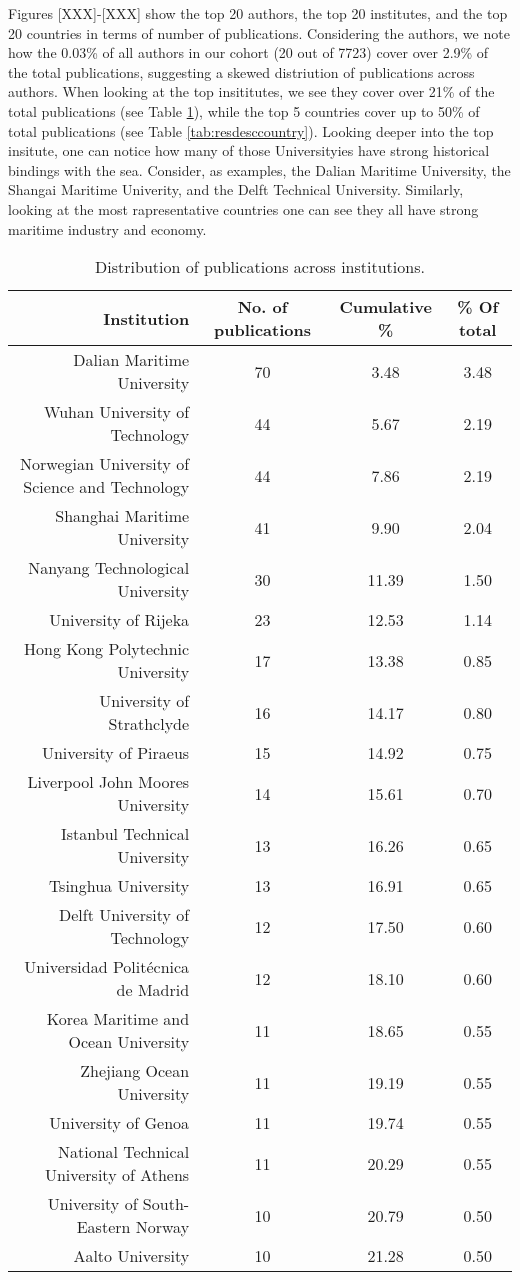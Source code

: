 \documentclass[a4paper, review, endfloat, authoryear]{elsarticle}
\begin{document}
	Figures [XXX]-[XXX] show the top 20 authors, the top 20 institutes, and the top 20 countries in terms of number of publications. Considering the authors, we note how the 0.03\% of all authors in our cohort (20 out of 7723) cover over 2.9\% of the total publications, suggesting a skewed distriution of publications across authors. When looking at the top insititutes, we see they cover over 21\% of the total publications (see Table \ref{tab:resdescinst}), while the top 5 countries cover up to 50\% of total publications (see Table \ref{tab:resdesccountry}). Looking deeper into the top insitute, one can notice how many of those Universityies have strong historical bindings with the sea. Consider, as examples, the Dalian Maritime University, the Shangai Maritime Univerity, and the Delft Technical University. Similarly, looking at the most rapresentative countries one can see they all have strong maritime industry and economy.
	
	\begin{table}[h]
		\centering
		\caption{Distribution of publications across institutions.}
		\begin{tabular}{r c c c}
			\hline
			Institution & No. of publications & Cumulative \% & \% Of total \\
			\hline
			Dalian Maritime University & 70 & 3.48 & 3.48\\
			Wuhan University of Technology & 44 & 5.67 & 2.19\\
			Norwegian University of Science and Technology & 44 & 7.86 & 2.19\\
			Shanghai Maritime University & 41 & 9.90 & 2.04\\
			Nanyang Technological University & 30 & 11.39 & 1.50\\
			University of Rijeka & 23 & 12.53 & 1.14\\
			Hong Kong Polytechnic University & 17 & 13.38 & 0.85\\
			University of Strathclyde & 16 & 14.17 & 0.80\\
			University of Piraeus & 15 & 14.92 & 0.75\\
			Liverpool John Moores University & 14 & 15.61 & 0.70\\
			Istanbul Technical University & 13 & 16.26 & 0.65\\
			Tsinghua University & 13 & 16.91 & 0.65\\
			Delft University of Technology & 12 & 17.50 & 0.60\\
			Universidad Politécnica de Madrid & 12 & 18.10 & 0.60\\
			Korea Maritime and Ocean University & 11 & 18.65 & 0.55\\
			Zhejiang Ocean University & 11 & 19.19 & 0.55\\
			University of Genoa & 11 & 19.74 & 0.55\\
			National Technical University of Athens & 11 & 20.29 & 0.55\\
			University of South-Eastern Norway & 10 & 20.79 & 0.50\\
			Aalto University & 10 & 21.28 & 0.50\\
			\hline
		\end{tabular}
		\label{tab:resdescinst}
	\end{table}
\end{document}
